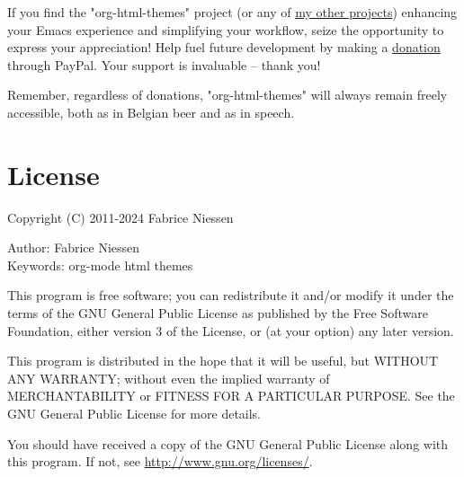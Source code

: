 \documentclass[11pt]{article}
\begin{document}
If you find the "org-html-themes" project (or any of \href{https://github.com/fniessen/}{my other projects})
enhancing your Emacs experience and simplifying your workflow, seize the
opportunity to express your appreciation!  Help fuel future development by
making a \href{https://www.paypal.com/cgi-bin/webscr?cmd=\_donations\&business=VCVAS6KPDQ4JC\&lc=BE\&item\_number=org\%2dhtml\%2dthemes\&currency\_code=EUR\&bn=PP\%2dDonationsBF\%3abtn\_donate\_LG\%2egif\%3aNonHosted}{donation} through PayPal. Your support is invaluable -- thank you!

Remember, regardless of donations, "org-html-themes" will always remain freely
accessible, both as in Belgian beer and as in speech.

\section{License}
\label{sec:org1d0a147}

Copyright (C) 2011-2024 Fabrice Niessen

Author: Fabrice Niessen \\[0pt]
Keywords: org-mode html themes

This program is free software; you can redistribute it and/or modify it under
the terms of the GNU General Public License as published by the Free Software
Foundation, either version 3 of the License, or (at your option) any later
version.

This program is distributed in the hope that it will be useful, but WITHOUT ANY
WARRANTY; without even the implied warranty of MERCHANTABILITY or FITNESS FOR
A PARTICULAR PURPOSE.  See the GNU General Public License for more details.

You should have received a copy of the GNU General Public License along with
this program.  If not, see \url{http://www.gnu.org/licenses/}.
\end{document}
